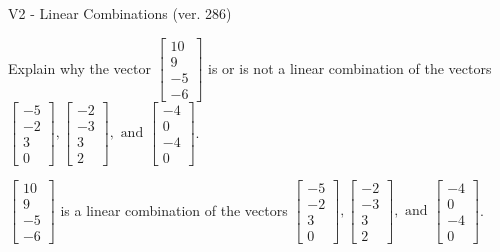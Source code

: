 \begin{exercise}
  \begin{exerciseTitle}V2 - Linear Combinations (ver. 286)\end{exerciseTitle}
  \begin{exerciseStatement}
    Explain why the vector \(\left[\begin{array}{c}
10 \\
9 \\
-5 \\
-6
\end{array}\right]\)  is or is not a linear 
	combination of the vectors \(\left[\begin{array}{c}
-5 \\
-2 \\
3 \\
0
\end{array}\right] , \left[\begin{array}{c}
-2 \\
-3 \\
3 \\
2
\end{array}\right] , \text{ and } \left[\begin{array}{c}
-4 \\
0 \\
-4 \\
0
\end{array}\right]\).
	


  \end{exerciseStatement}
  \begin{exerciseAnswer}
   \(\left[\begin{array}{c}
10 \\
9 \\
-5 \\
-6
\end{array}\right]\) 
  	 is  
	a linear combination of the vectors \(\left[\begin{array}{c}
-5 \\
-2 \\
3 \\
0
\end{array}\right] , \left[\begin{array}{c}
-2 \\
-3 \\
3 \\
2
\end{array}\right] , \text{ and } \left[\begin{array}{c}
-4 \\
0 \\
-4 \\
0
\end{array}\right]\).

	
  


  \end{exerciseAnswer}
\end{exercise}